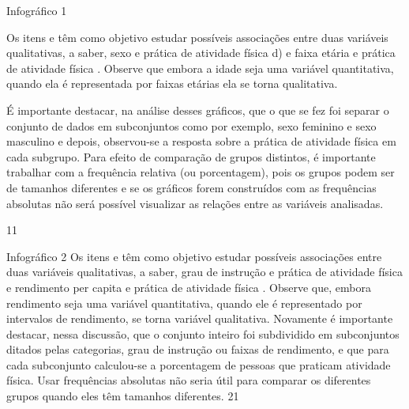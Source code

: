\begin{sugestions}{Infográfico 1}
{Os itens  e  têm como objetivo estudar possíveis associações entre duas variáveis qualitativas, a saber, sexo e prática de atividade física d) e faixa etária e prática de atividade física . Observe que embora a idade seja uma variável quantitativa, quando ela é representada por faixas etárias ela se torna qualitativa.

É importante destacar, na análise desses gráficos, que o que se fez foi separar o conjunto de dados em subconjuntos como por exemplo, sexo feminino e sexo masculino e depois, observou-se a resposta sobre a prática de atividade física em cada subgrupo. Para efeito de comparação de grupos distintos, é importante trabalhar com a frequência relativa (ou porcentagem), pois os grupos podem ser de tamanhos diferentes e se os gráficos forem construídos com as frequências absolutas não será possível visualizar as relações entre as variáveis analisadas.
}{1}{1}
\end{sugestions}
\begin{sugestions}{Infográfico 2}
{
Os itens  e  têm como objetivo estudar possíveis associações entre duas variáveis qualitativas, a saber, grau de instrução e prática de atividade física  e rendimento per capita e prática de atividade física . Observe que, embora rendimento seja uma variável quantitativa, quando ele é representado por intervalos de rendimento, se torna variável qualitativa. Novamente é importante destacar, nessa discussão, que o conjunto inteiro foi subdividido em subconjuntos ditados pelas categorias, grau de instrução ou faixas de rendimento, e que para cada subconjunto calculou-se a porcentagem de pessoas que praticam atividade física. Usar frequências absolutas não seria útil para comparar os diferentes grupos quando eles têm tamanhos diferentes.
}{2}{1}
\end{sugestions}
